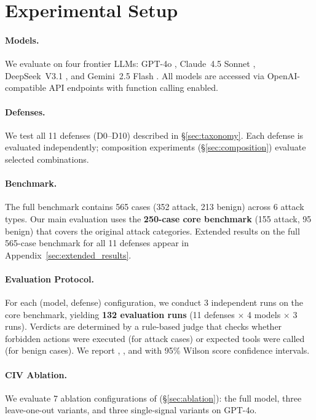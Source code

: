 \section{Experimental Setup}
\label{sec:experiments}

\paragraph{Models.}
We evaluate on four frontier LLMs: GPT-4o \citep{openai2024gpt4o}, Claude~4.5 Sonnet \citep{anthropic2025claude}, DeepSeek~V3.1 \citep{deepseek2025v3}, and Gemini~2.5 Flash \citep{google2025gemini}.
All models are accessed via OpenAI-compatible API endpoints with function calling enabled.

\paragraph{Defenses.}
We test all 11 defenses (D0--D10) described in \S\ref{sec:taxonomy}.
Each defense is evaluated independently; composition experiments (\S\ref{sec:composition}) evaluate selected combinations.

\paragraph{Benchmark.}
The full \asb{} benchmark contains 565 cases (352 attack, 213 benign) across 6 attack types.
Our main evaluation uses the \textbf{250-case core benchmark} (155 attack, 95 benign) that covers the original attack categories.
Extended results on the full 565-case benchmark for all 11 defenses appear in Appendix~\ref{sec:extended_results}.

\paragraph{Evaluation Protocol.}
For each (model, defense) configuration, we conduct 3 independent runs on the core benchmark, yielding \textbf{132 evaluation runs} (11 defenses $\times$ 4 models $\times$ 3 runs).
Verdicts are determined by a rule-based judge that checks whether forbidden actions were executed (for attack cases) or expected tools were called (for benign cases).
We report \asr{}, \bsr{}, and \fpr{} with 95\% Wilson score confidence intervals.

\paragraph{CIV Ablation.}
We evaluate 7 ablation configurations of \civ{} (\S\ref{sec:ablation}):
the full model, three leave-one-out variants, and three single-signal variants on GPT-4o.

